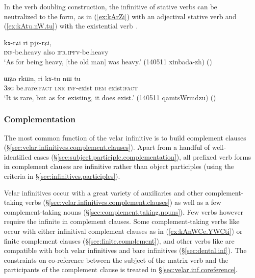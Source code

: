 In the verb doubling construction, the infinitive of stative verbs can be neutralized to the  form, as in (\ref{ex:kArZi}) with an adjectival stative verb and (\ref{ex:kAtu.nW.tu}) with the existential verb .

\begin{exe}
\ex \label{ex:kArZi}
 \gll kɤ-rʑi ri pjɤ-rʑi, 	  \\
 \textsc{inf}-be.heavy also \textsc{ifr}.\textsc{ipfv}-be.heavy \\
 \glt `As for being heavy, [the old man] was heavy.'  (140511 xinbada-zh) ()
\end{exe}

\begin{exe}
\ex \label{ex:kAtu.nW.tu}
 \gll ɯʑo rkɯn, ri kɤ-tu nɯ tu  \\
 \textsc{3sg} be.rare:\textsc{fact} \textsc{lnk} \textsc{inf}-exist \textsc{dem} exist:\textsc{fact} \\
 \glt `It is rare, but as for existing, it does exist.' (140511 qamtsWrmdzu)
()
\end{exe}

\subsubsection{Complementation}    \label{sec:inf.complementation}
The most common function of the velar infinitive is to build complement clauses (§\ref{sec:velar.infinitives.complement.clauses}). Apart from a handful of well-identified cases (§\ref{sec:subject.participle.complementation}), all  prefixed verb forms in complement clauses are infinitive rather than object participles (using the criteria in §\ref{sec:infinitives.participles}). 

Velar infinitives occur with a great variety of auxiliaries and other complement-taking verbs (§\ref{sec:velar.infinitives.complement.clauses}) as well as a few complement-taking nouns (§\ref{sec:complement.taking.nouns}). Few verbs however require the infinite in complement clauses. Some complement-taking verbs like  occur with either infinitival complement clauses as in (\ref{ex:kAnWCe.YWCti}) or finite complement clauses (§\ref{sec:finite.complement}), and other verbs like  are compatible with both velar infinitives and bare infinitives (§\ref{sec:dental.inf}). The constraints on co-reference between the subject of the matrix verb and the participants of the complement clause is treated in §\ref{sec:velar.inf.coreference}.


